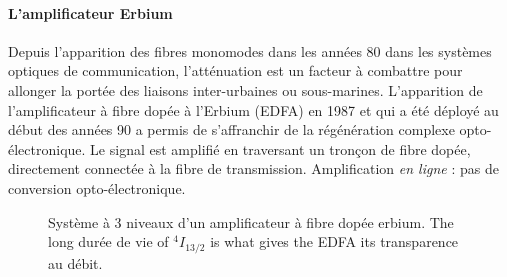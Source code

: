 \paragraph{L'amplificateur Erbium}
Depuis l'apparition des fibres monomodes dans les années 80 dans les systèmes
optiques de communication, l'atténuation est un facteur à combattre pour
allonger la portée des liaisons inter-urbaines ou sous-marines. L'apparition de
l'amplificateur à fibre dopée à l'Erbium (EDFA) en 1987 et qui a été déployé au
début des années 90 a permis de s'affranchir de la régénération complexe
opto-électronique. Le signal est amplifié en traversant un tronçon de fibre
dopée, directement connectée à la fibre de transmission. Amplification
\emph{en ligne} : pas de conversion opto-électronique.

\begin{figure}[h!]
  \centering
  \caption*{\footnotesize Système à 3 niveaux d'un amplificateur à fibre dopée
  erbium. The long durée de vie of $^4I_{13/2}$ is what gives the EDFA its
  transparence au débit.}
\end{figure}

